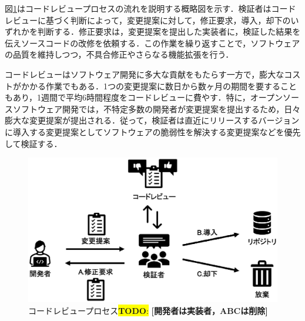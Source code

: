 \documentclass[submit,ses,noauthor]{ipsj}
\newcommand{\todo}[1]{\colorbox{yellow}{{\bf TODO}:}{\color{red} {\textbf{[#1]}}}}
\begin{document}
図\ref{fig:codereviewprocess}はコードレビュープロセスの流れを説明する概略図を示す．検証者はコードレビューに基づく判断によって，変更提案に対して，修正要求，導入，却下のいずれかを判断する．修正要求は，変更提案を提出した実装者に，検証した結果を伝えソースコードの改修を依頼する．この作業を繰り返すことで，ソフトウェアの品質を維持しつつ，不具合修正やさらなる機能拡張を行う．

コードレビューはソフトウェア開発に多大な貢献をもたらす一方で，膨大なコストがかかる作業でもある．1つの変更提案に数日から数ヶ月の期間を要することもあり，1週間で平均6時間程度をコードレビューに費やす\cite{review2}．特に，オープンソースソフトウェア開発では，不特定多数の開発者が変更提案を提出するため，日々膨大な変更提案が提出される．従って，検証者は直近にリリースするバージョンに導入する変更提案としてソフトウェアの脆弱性を解決する変更提案などを優先して検証する．\cite{}


\begin{figure}[t]
\begin{center}
\includegraphics[width=1.0\linewidth]{fig/CodeReviewProcess.eps}
\caption{コードレビュープロセス\todo{開発者は実装者，ABCは削除}}
\label{fig:codereviewprocess}
\end{center}
\end{figure}
\end{document}
